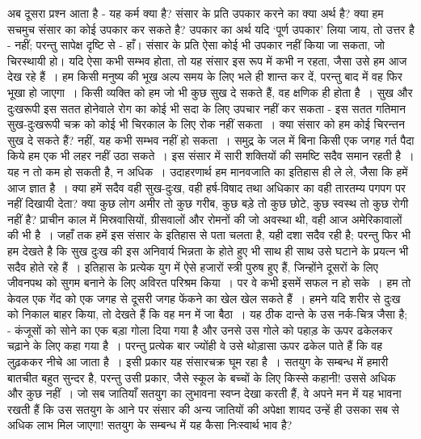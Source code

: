 अब दूसरा प्रश्न आता है - यह कर्म क्या है? संसार के प्रति उपकार करने का क्या अर्थ है? क्या हम सचमुच संसार का कोई उपकार कर सकते है? उपकार का अर्थ यदि ‘पूर्ण उपकार’ लिया जाय, तो उत्तर है - नहीं; परन्तु सापेक्ष दृष्टि से - हाँ। संसार के प्रति ऐसा कोई भी उपकार नहीं किया जा सकता, जो चिरस्थायी हो। यदि ऐसा कभी सम्भव होता, तो यह संसार इस रूप में कभी न रहता, जैसा उसे हम आज देख रहे हैं~। हम किसी मनुष्य की भूख अल्प समय के लिए भले ही शान्त कर दें, परन्तु बाद में वह फिर भूखा हो जाएगा~। किसी व्यक्ति को हम जो भी कुछ सुख दे सकते हैं, वह क्षणिक ही होता है~। सुख और दुःखरूपी इस सतत होनेवाले रोग का कोई भी सदा के लिए उपचार नहीं कर सकता - इस सतत गतिमान सुख-दुःखरूपी चक्र को कोई भी चिरकाल के लिए रोक नहीं सकता~। क्या संसार को हम कोई चिरन्तन सुख दे सकते हैं? नहीं, यह कभी सम्भव नहीं हो सकता~। समुद्र के जल में बिना किसी एक जगह गर्त पैदा किये हम एक भी लहर नहीं उठा सकते~। इस संसार में सारी शक्तियों की समष्टि सदैव समान रहती है~। यह न तो कम हो सकती है, न अधिक~। उदाहरणार्थ हम मानवजाति का इतिहास ही ले ले, जैसा कि हमें आज ज्ञात है~। क्या हमें सदैव वही सुख-दुःख, वही हर्ष-विषाद तथा अधिकार का वही तारतम्य पगपग पर नहीं दिखायी देता? क्या कुछ लोग अमीर तो कुछ गरीब, कुछ बड़े तो कुछ छोटे, कुछ स्वस्थ तो कुछ रोगी नहीं है? प्राचीन काल में मिस्रवासियों, ग्रीसवालों और रोमनों की जो अवस्था थी, वही आज अमेरिकावालों की भी है~। जहाँ तक हमें इस संसार के इतिहास से पता चलता है, यही दशा सदैव रही है; परन्तु फिर भी हम देखते है कि सुख दुःख की इस अनिवार्य भिन्नता के होते हुए भी साथ ही साथ उसे घटाने के प्रयत्न भी सदैव होते रहे हैं~। इतिहास के प्रत्येक युग में ऐसे हजारों स्त्री पुरुष हुए हैं, जिन्होंने दूसरों के लिए जीवनपथ को सुगम बनाने के लिए अविरत परिश्रम किया~। पर वे कभी इसमें सफल न हो सके~। हम तो केवल एक गेंद को एक जगह से दूसरी जगह फेंकने का खेल खेल सकते हैं~। हमने यदि शरीर से दुःख को निकाल बाहर किया, तो देखते हैं कि वह मन में जा बैठा~। यह ठीक दान्ते के उस नर्क-चित्र जैसा है; - कंजूसों को सोने का एक बड़ा गोला दिया गया है और उनसे उस गोले को पहाड़ के ऊपर ढकेलकर चढ़ाने के लिए कहा गया है~। परन्तु प्रत्येक बार ज्योंही वे उसे थोड़ासा ऊपर ढकेल पाते हैं कि वह लुढ़ककर नीचे आ जाता है~। इसी प्रकार यह संसारचक्र घूम रहा है~। सतयुग के सम्बन्ध में हमारी बातचीत बहुत सुन्दर है, परन्तु उसी प्रकार, जैसे स्कूल के बच्चों के लिए किस्से कहानी! उससे अधिक और कुछ नहीं~। जो सब जातियाँ सतयुग का लुभावना स्वप्न देखा करती हैं, वे अपने मन में यह भावना रखती हैं कि उस सतयुग के आने पर संसार की अन्य जातियों की अपेक्षा शायद उन्हें ही उसका सब से अधिक लाभ मिल जाएगा! सतयुग के सम्बन्ध में यह कैसा निःस्वार्थ भाव है?

